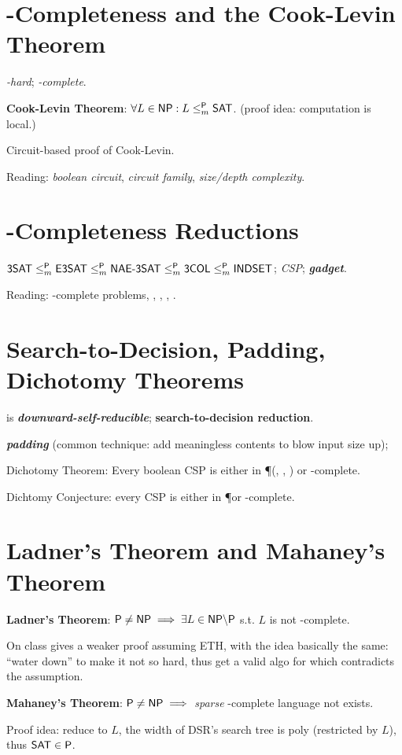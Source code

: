 \documentclass{article}
\begin{document}
\section{\NP-Completeness and the Cook-Levin Theorem}

\textit{\NP-hard};
\textit{\NP-complete}.
\par
\textbf{Cook-Levin Theorem}: $\forall L \in \text{\sf NP}: L \leq_m^\text{\sf P} \text{\sf SAT}$. (proof idea: computation is local.)
\par
Circuit-based proof of Cook-Levin.
\par
Reading: \textit{boolean circuit}, \textit{circuit family}, \textit{size/depth complexity}.


\section{\NP-Completeness Reductions}

$\text{\sf 3SAT} \leq_m^\text{\sf P} \text{\sf E3SAT} \leq_m^\text{\sf P} \text{\sf NAE-3SAT} \leq_m^\text{\sf P} \text{\sf 3COL} \leq_m^\text{\sf P} \text{\sf INDSET}$;
\textit{CSP};
\textit{\textbf{gadget}}.
\par
Reading: \NP-complete problems, , , , .


\section{Search-to-Decision, Padding, Dichotomy Theorems}

 is \textit{\textbf{downward-self-reducible}}; \textbf{search-to-decision reduction}.
\par
\textit{\textbf{padding}} (common technique: add meaningless contents to blow input size up);
\par
Dichotomy Theorem: Every boolean CSP is either in \P (, , ) or \NP-complete.
\par
Dichtomy Conjecture: every CSP is either in \P or \NP-complete.


\section{Ladner's Theorem and Mahaney's Theorem}

\textbf{Ladner's Theorem}: $\text{\sf P} \neq \text{\sf NP} \implies \exists L \in \text{\sf NP} \backslash \text{\sf P}$ s.t. $L$ is not \NP-complete.
\par
On class gives a weaker proof assuming ETH, with the idea basically the same: ``water down''  to make it not so hard, thus get a valid algo for  which contradicts the assumption.
\par
\textbf{Mahaney's Theorem}: $\text{\sf P} \neq \text{\sf NP} \implies$ \textit{sparse} \NP-complete language not exists.
\par
Proof idea: reduce  to $L$, the width of DSR's search tree is poly (restricted by $L$), thus $\text{\sf SAT} \in \text{\sf P}$.
\end{document}
